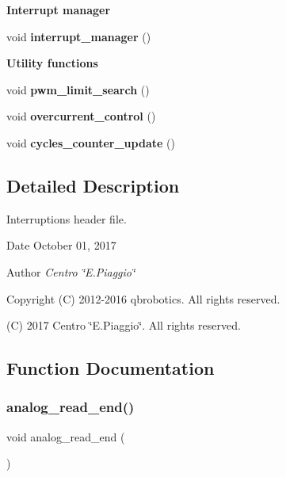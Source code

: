 \begin{Indent}\textbf{ Interrupt manager}\par
\begin{DoxyCompactItemize}
\item 
void \textbf{ interrupt\+\_\+manager} ()
\end{DoxyCompactItemize}
\end{Indent}
\begin{Indent}\textbf{ Utility functions}\par
\begin{DoxyCompactItemize}
\item 
void \textbf{ pwm\+\_\+limit\+\_\+search} ()
\item 
void \textbf{ overcurrent\+\_\+control} ()
\item 
void \textbf{ cycles\+\_\+counter\+\_\+update} ()
\end{DoxyCompactItemize}
\end{Indent}


\subsection{Detailed Description}
Interruptions header file. 

\begin{DoxyDate}{Date}
October 01, 2017 
\end{DoxyDate}
\begin{DoxyAuthor}{Author}
{\itshape Centro \char`\"{}\+E.\+Piaggio\char`\"{}} 
\end{DoxyAuthor}
\begin{DoxyCopyright}{Copyright}
(C) 2012-\/2016 qbrobotics. All rights reserved. 

(C) 2017 Centro \char`\"{}\+E.\+Piaggio\char`\"{}. All rights reserved. 
\end{DoxyCopyright}


\subsection{Function Documentation}
\mbox{\label{interruptions_8h_a00a8d34962a63161405e5d7785b9625e}} 
\subsubsection{analog\+\_\+read\+\_\+end()}
{\footnotesize\ttfamily void analog\+\_\+read\+\_\+end (\begin{DoxyParamCaption}{ }\end{DoxyParamCaption})}

